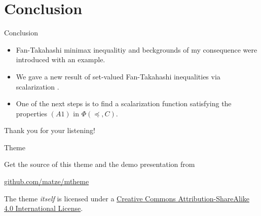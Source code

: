 \documentclass[aspectratio=169, dvipdfmx, 11pt]{beamer}
\begin{document}
\section{Conclusion}

\begin{frame}{Conclusion}
  \begin{itemize}
    \item Fan-Takahashi minimax inequalitiy and beckgrounds of my consequence were introduced with an example.
    \item We gave a new result of set-valued Fan-Takahashi inequalities via scalarization  .
    \item One of the next steps is to find a scalarization function satisfying the properties $(A1)$ in $\Phi(\preccurlyeq, C)$.
  \end{itemize}
\end{frame}

\begin{frame}[allowframebreaks]
  \printbibliography
\end{frame}

\begin{frame}
  Thank you for your listening!
\end{frame}

\begin{frame}{Theme}

  Get the source of this theme and the demo presentation from

  \begin{center}\url{github.com/matze/mtheme}\end{center}

  The theme \emph{itself} is licensed under a
  \href{http://creativecommons.org/licenses/by-sa/4.0/}{Creative Commons
    Attribution-ShareAlike 4.0 International License}.

  \begin{center}\ccbysa\end{center}
\end{frame}
\end{document}
